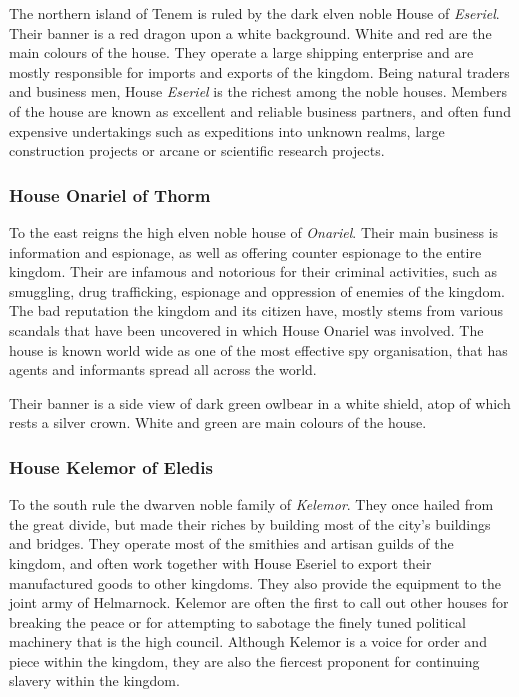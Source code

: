 The northern island of Tenem is ruled by the dark elven noble House of
\emph{Eseriel}. Their banner is a red dragon upon a white background. White
and red are the main colours of the house. They operate a large shipping
enterprise and are mostly responsible for imports and exports of the
kingdom. Being natural traders and business men, House \emph{Eseriel} is the
richest among the noble houses. Members of the house are known as excellent
and reliable business partners, and often fund expensive undertakings such
as expeditions into unknown realms, large construction projects or arcane
or scientific research projects.

\subsubsection{House Onariel of Thorm}
\label{sec:House Onariel}

To the east reigns the high elven noble house of \emph{Onariel}. Their main
business is information and espionage, as well as offering counter espionage
to the entire kingdom. Their are infamous and notorious for their criminal
activities, such as smuggling, drug trafficking, espionage and oppression
of enemies of the kingdom. The bad reputation the kingdom and its citizen
have, mostly stems from various scandals that have been uncovered in which
House Onariel was involved. The house is known world wide as one of the most
effective spy organisation, that has agents and informants spread all across
the world.

Their banner is a side view of dark green owlbear in a white shield, atop of
which rests a silver crown. White and green are main colours of the house.

\subsubsection{House Kelemor of Eledis}
\label{sec:House Kelemor}

To the south rule the dwarven noble family of \emph{Kelemor}. They once
hailed from the great divide, but made their riches by building most of
the city's buildings and bridges. They operate most of the smithies and
artisan guilds of the kingdom, and often work together with House Eseriel to
export their manufactured goods to other kingdoms. They also provide the
equipment to the joint army of Helmarnock. Kelemor are often the first to call
out other houses for breaking the peace or for attempting to sabotage the
finely tuned political machinery that is the high council. Although Kelemor is
a voice for order and piece within the kingdom, they are also the fiercest
proponent for continuing slavery within the kingdom.

